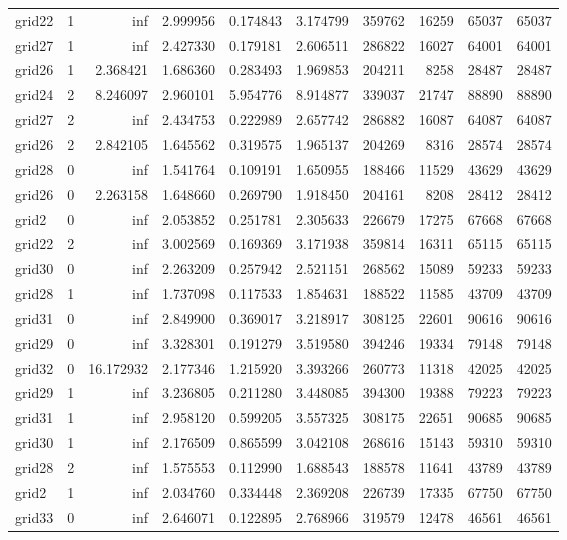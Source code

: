 \begin{longtable}{|l|r|r|r|r|r|r|r|r|r|}
grid22 & 1 & inf & 2.999956 & 0.174843 & 3.174799 & 359762 & 16259 & 65037 & 65037 \\
grid27 & 1 & inf & 2.427330 & 0.179181 & 2.606511 & 286822 & 16027 & 64001 & 64001 \\
grid26 & 1 & 2.368421 & 1.686360 & 0.283493 & 1.969853 & 204211 & 8258 & 28487 & 28487 \\
grid24 & 2 & 8.246097 & 2.960101 & 5.954776 & 8.914877 & 339037 & 21747 & 88890 & 88890 \\
grid27 & 2 & inf & 2.434753 & 0.222989 & 2.657742 & 286882 & 16087 & 64087 & 64087 \\
grid26 & 2 & 2.842105 & 1.645562 & 0.319575 & 1.965137 & 204269 & 8316 & 28574 & 28574 \\
grid28 & 0 & inf & 1.541764 & 0.109191 & 1.650955 & 188466 & 11529 & 43629 & 43629 \\
grid26 & 0 & 2.263158 & 1.648660 & 0.269790 & 1.918450 & 204161 & 8208 & 28412 & 28412 \\
grid2 & 0 & inf & 2.053852 & 0.251781 & 2.305633 & 226679 & 17275 & 67668 & 67668 \\
grid22 & 2 & inf & 3.002569 & 0.169369 & 3.171938 & 359814 & 16311 & 65115 & 65115 \\
grid30 & 0 & inf & 2.263209 & 0.257942 & 2.521151 & 268562 & 15089 & 59233 & 59233 \\
grid28 & 1 & inf & 1.737098 & 0.117533 & 1.854631 & 188522 & 11585 & 43709 & 43709 \\
grid31 & 0 & inf & 2.849900 & 0.369017 & 3.218917 & 308125 & 22601 & 90616 & 90616 \\
grid29 & 0 & inf & 3.328301 & 0.191279 & 3.519580 & 394246 & 19334 & 79148 & 79148 \\
grid32 & 0 & 16.172932 & 2.177346 & 1.215920 & 3.393266 & 260773 & 11318 & 42025 & 42025 \\
grid29 & 1 & inf & 3.236805 & 0.211280 & 3.448085 & 394300 & 19388 & 79223 & 79223 \\
grid31 & 1 & inf & 2.958120 & 0.599205 & 3.557325 & 308175 & 22651 & 90685 & 90685 \\
grid30 & 1 & inf & 2.176509 & 0.865599 & 3.042108 & 268616 & 15143 & 59310 & 59310 \\
grid28 & 2 & inf & 1.575553 & 0.112990 & 1.688543 & 188578 & 11641 & 43789 & 43789 \\
grid2 & 1 & inf & 2.034760 & 0.334448 & 2.369208 & 226739 & 17335 & 67750 & 67750 \\
grid33 & 0 & inf & 2.646071 & 0.122895 & 2.768966 & 319579 & 12478 & 46561 & 46561 \\

\end{longtable}
